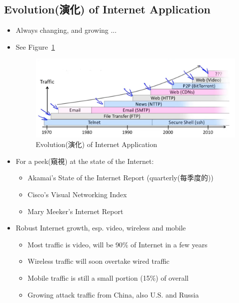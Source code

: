 \documentclass[12pt]{ctexart}   %
\begin{document}
	\subsection{Evolution(演化) of Internet Application}
	\begin{itemize}
		\item Always changing, and growing ...
		\item See Figure~\ref{fig:8-1-5}
		  
		 \begin{figure}[h!] %
		\centering
		 \includegraphics[scale=0.7]{images/8-1-5}
		\caption{ Evolution(演化) of Internet Application}
		 \label{fig:8-1-5}
		 \end{figure}
		 
		 \item For a peek(窺視) at the state of the Internet:
		 \begin{itemize}
		 	\item Akamai's State of the Internet Report (quarterly(每季度的))
		 	\item Cisco's Visual Networking Index
		 	\item Mary Meeker's Internet Report
		 \end{itemize}
		 
		 \item Robust Internet growth, esp. video, wireless and mobile
		 \begin{itemize}
		 	\item Most traffic is video, will be 90\% of Internet in a few years
		 	\item Wireless traffic will soon overtake wired traffic
		 	\item Mobile traffic is still a small portion (15\%) of overall
		 	\item Growing attack traffic from China, also U.S. and Russia
		 \end{itemize}
	\end{itemize}
	
\end{document}
